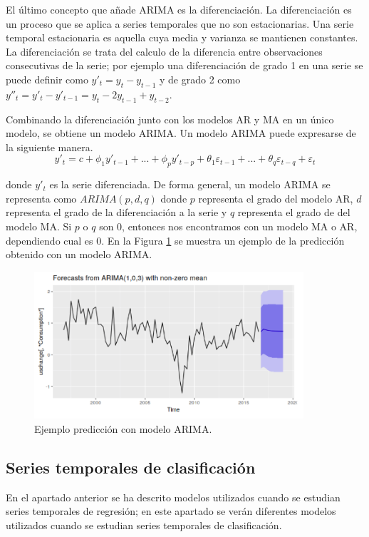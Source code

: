 El último concepto que añade ARIMA es la diferenciación. La diferenciación es un proceso que se aplica a series temporales que no son estacionarias. Una serie temporal estacionaria es aquella cuya media y varianza se mantienen constantes. La diferenciación se trata del calculo de la diferencia entre observaciones consecutivas de la serie; por ejemplo una diferenciación de grado 1 en una serie se puede definir como $ y'_t = y_t - y_{t-1}$ y de grado 2 como $y''_t = y'_t - y'_{t-1} = y_t - 2y_{t-1} + y_{t-2}$.\newline

Combinando la diferenciación junto con los modelos AR y MA en un único modelo, se obtiene un modelo ARIMA. Un modelo ARIMA puede expresarse de la siguiente manera.
$$ y'_t = c + \phi_1 y'_{t-1} + ... + \phi_p y'_{t-p} + \theta_1 \varepsilon_{t-1} + ... + \theta_q \varepsilon_{t-q} + \varepsilon_t $$

\noindent donde $y'_t$ es la serie diferenciada. De forma general, un modelo ARIMA se representa como $ARIMA(p,d,q)$ donde $p$ representa el grado del modelo AR, $d$ representa el grado de la diferenciación a la serie y $q$ representa el grado de del modelo MA. Si $p$ o $q$ son 0, entonces nos encontramos con un modelo MA o AR, dependiendo cual es 0. En la Figura \ref{fig:213} se muestra un ejemplo de la predicción obtenido con un modelo ARIMA.\newline

\begin{figure}[H]
	\centering
	\includegraphics[width=100mm]{imagenes/arima_example.png}
	\caption{Ejemplo predicción con modelo ARIMA.}
	\label{fig:213}
\end{figure}
\subsection{Series temporales de clasificación}
En el apartado anterior se ha descrito modelos utilizados cuando se estudian series temporales de regresión; en este apartado se verán diferentes modelos utilizados cuando se estudian series temporales de clasificación.\newline

